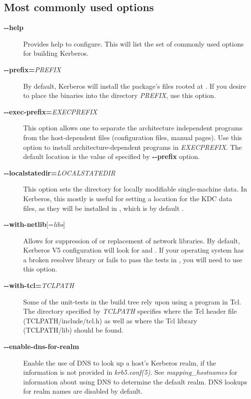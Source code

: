 \documentclass[letterpaper,10pt,english]{sphinxmanual}
\begin{document}
\subsection{Most commonly used options}
\label{build/options2configure:most-commonly-used-options}\begin{description}
\item[{\textbf{-}\textbf{-help}}] \leavevmode
Provides help to configure.  This will list the set of commonly
used options for building Kerberos.

\item[{\textbf{-}\textbf{-prefix=}\emph{PREFIX}}] \leavevmode
By default, Kerberos will install the package's files rooted at
.  If you desire to place the binaries into the
directory \emph{PREFIX}, use this option.

\item[{\textbf{-}\textbf{-exec-prefix=}\emph{EXECPREFIX}}] \leavevmode
This option allows one to separate the architecture independent
programs from the host-dependent files (configuration files,
manual pages).  Use this option to install architecture-dependent
programs in \emph{EXECPREFIX}.  The default location is the value of
specified by \textbf{-}\textbf{-prefix} option.

\item[{\textbf{-}\textbf{-localstatedir=}\emph{LOCALSTATEDIR}}] \leavevmode
This option sets the directory for locally modifiable
single-machine data.  In Kerberos, this mostly is useful for
setting a location for the KDC data files, as they will be
installed in , which is by default
.

\item[{\textbf{-}\textbf{-with-netlib}{[}=\emph{libs}{]}}] \leavevmode
Allows for suppression of or replacement of network libraries.  By
default, Kerberos V5 configuration will look for  and
.  If your operating system has a broken resolver
library or fails to pass the tests in , you
will need to use this option.

\item[{\textbf{-}\textbf{-with-tcl=}\emph{TCLPATH}}] \leavevmode
Some of the unit-tests in the build tree rely upon using a program
in Tcl.  The directory specified by \emph{TCLPATH} specifies where the
Tcl header file (TCLPATH/include/tcl.h) as well as where the Tcl
library (TCLPATH/lib) should be found.

\item[{\textbf{-}\textbf{-enable-dns-for-realm}}] \leavevmode
Enable the use of DNS to look up a host's Kerberos realm,
if the information is not provided in
\emph{krb5.conf(5)}.  See \emph{mapping\_hostnames}
for information about using DNS to determine the default realm.
DNS lookups for realm names are disabled by default.


\end{description}
\end{document}
